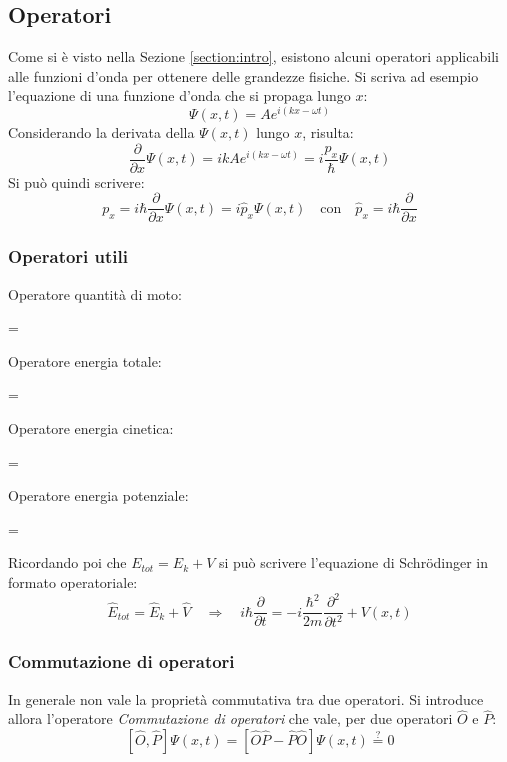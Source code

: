 \documentclass{article}
\newcommand{\schr}{Schr\"odinger }
\begin{document}
\subsection{Operatori}
\label{section:operatori}

Come si è visto nella Sezione \ref{section:intro}, esistono alcuni operatori applicabili alle funzioni d'onda per ottenere delle grandezze fisiche. Si scriva ad esempio l'equazione di una funzione d'onda che si propaga lungo \(x\):
\[\Psi (x,t)= A e^{i(kx-\omega t)}\]
Considerando la derivata della \(\Psi (x,t)\) lungo \(x\), risulta:
\[\frac{\partial}{\partial x}\Psi (x,t)= ikA e^{i(kx-\omega t)}= i\frac{p_x}{\hbar}\Psi (x,t)\]
Si può quindi scrivere:
\[p_x = i\hbar\frac{\partial}{\partial x}\Psi (x,t)= i\hat p_x \Psi (x,t) \quad \text{con} \quad \hat p_x =i\hbar\frac{\partial}{\partial x}\]



\subsubsection{Operatori utili} 

Operatore quantità di moto:
\begin{tcolorbox} = 
\end{tcolorbox}
Operatore energia totale:
\begin{tcolorbox} = 
\end{tcolorbox}
Operatore energia cinetica:
\begin{tcolorbox} = 
\end{tcolorbox}
Operatore energia potenziale:
\begin{tcolorbox} = \left[  V(x,t) \right]
\end{tcolorbox}

Ricordando poi che \(E_{tot}=E_k+V\) si può scrivere l'equazione di \schr in formato operatoriale:
\[\hat E_{tot} = \hat E_k + \hat V \quad \Longrightarrow \quad i\hbar\frac{\partial}{\partial t}=-i\frac{\hbar^2}{2m}\frac{\partial^2}{\partial t^2}+ V(x,t)\]



\subsubsection{Commutazione di operatori}
In generale non vale la proprietà commutativa tra due operatori. Si introduce allora l'operatore \emph{Commutazione di operatori} che vale, per due operatori \(\hat O\) e \(\hat P\):
\[ \left[\hat O, \hat P\right] \Psi(x,t) = \left[ \hat O \hat P-\hat P \hat O\right]  \Psi(x,t)\stackrel{?}{=}0\]
\end{document}
